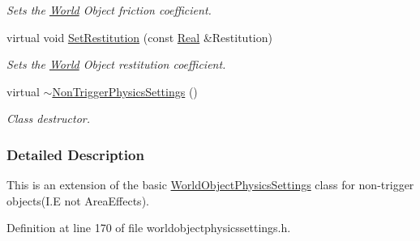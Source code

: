\begin{DoxyCompactItemize}
\begin{DoxyCompactList}\small\item\em Sets the \hyperlink{classMezzanine_1_1World}{World} Object friction coefficient. \item\end{DoxyCompactList}\item 
virtual void \hyperlink{classMezzanine_1_1NonTriggerPhysicsSettings_aafac25739c10d408c38a3fdd107897be}{SetRestitution} (const \hyperlink{namespaceMezzanine_a726731b1a7df72bf3583e4a97282c6f6}{Real} \&Restitution)
\begin{DoxyCompactList}\small\item\em Sets the \hyperlink{classMezzanine_1_1World}{World} Object restitution coefficient. \item\end{DoxyCompactList}\item 
\hypertarget{classMezzanine_1_1NonTriggerPhysicsSettings_a7c32afaa05f2f971533659ddca2f95b4}{
virtual \hyperlink{classMezzanine_1_1NonTriggerPhysicsSettings_a7c32afaa05f2f971533659ddca2f95b4}{$\sim$NonTriggerPhysicsSettings} ()}
\label{classMezzanine_1_1NonTriggerPhysicsSettings_a7c32afaa05f2f971533659ddca2f95b4}

\begin{DoxyCompactList}\small\item\em Class destructor. \item\end{DoxyCompactList}\end{DoxyCompactItemize}


\subsubsection{Detailed Description}
This is an extension of the basic \hyperlink{classMezzanine_1_1WorldObjectPhysicsSettings}{WorldObjectPhysicsSettings} class for non-\/trigger objects(I.E not AreaEffects). 

Definition at line 170 of file worldobjectphysicssettings.h.



